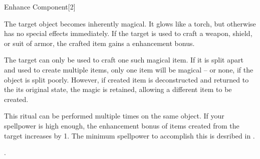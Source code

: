\begin{spellsection}{Enhance Component}[2]
    \begin{spellcontent}
        \begin{spelltargetinginfo}
        \end{spelltargetinginfo}
        \begin{spelleffects}
            \spelleffect The target object becomes inherently magical.
            It glows like a torch, but otherwise has no special effects immediately.
            If the target is used to craft a weapon, shield, or suit of armor, the crafted item gains a  enhancement bonus.

            The target can only be used to craft one such magical item.
            If it is split apart and used to create multiple items, only one item will be magical -- or none, if the object is split poorly.
            However, if created item is deconstructed and returned to the its original state, the magic is retained, allowing a different item to be created.

            This ritual can be performed multiple times on the same object.
            If your spellpower is high enough, the enhancement bonus of items created from the target increases by 1.
            The minimum spellpower to accomplish this is desribed in .
        \end{spelleffects}
    \end{spellcontent}
    \begin{spellfooter}
        .
    \end{spellfooter}
\end{spellsection}

